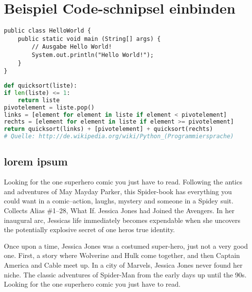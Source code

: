 
\chapter{Beispiel Code-schnipsel einbinden}


\begin{lstlisting}[caption=Code-Beispiel, label=Bsp.1]
public class HelloWorld {
	public static void main (String[] args) {
		// Ausgabe Hello World!
		System.out.println("Hello World!");
	}
}
\end{lstlisting}

\begin{lstlisting}[caption=Python-Code, label=Python-Code, title=Titel des Python-Codes,language=Python]
def quicksort(liste):
if len(liste) <= 1:
	return liste
pivotelement = liste.pop()
links = [element for element in liste if element < pivotelement]
rechts = [element for element in liste if element >= pivotelement]
return quicksort(links) + [pivotelement] + quicksort(rechts)
# Quelle: http://de.wikipedia.org/wiki/Python_(Programmiersprache)
\end{lstlisting}

\section{lorem ipsum}
Looking for the one superhero comic you just have to read. Following the antics and adventures of May Mayday Parker, this Spider-book has everything you could want in a comic--action, laughs, mystery and someone in a Spidey suit. Collects Alias \#1--28, What If. Jessica Jones had Joined the Avengers. In her inaugural arc, Jessicas life immediately becomes expendable when she uncovers the potentially explosive secret of one heros true identity. 

Once upon a time, Jessica Jones was a costumed super-hero, just not a very good one. First, a story where Wolverine and Hulk come together, and then Captain America and Cable meet up. In a city of Marvels, Jessica Jones never found her niche. The classic adventures of Spider-Man from the early days up until the 90s. Looking for the one superhero comic you just have to read.

